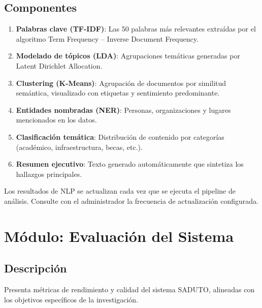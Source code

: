 \documentclass[12pt,a4paper]{article}
\begin{document}
\subsection{Componentes}
\begin{enumerate}
  \item \textbf{Palabras clave (TF-IDF)}: Las 50 palabras más relevantes extraídas por el algoritmo Term Frequency -- Inverse Document Frequency.
  \item \textbf{Modelado de tópicos (LDA)}: Agrupaciones temáticas generadas por Latent Dirichlet Allocation.
  \item \textbf{Clustering (K-Means)}: Agrupación de documentos por similitud semántica, visualizado con etiquetas y sentimiento predominante.
  \item \textbf{Entidades nombradas (NER)}: Personas, organizaciones y lugares mencionados en los datos.
  \item \textbf{Clasificación temática}: Distribución de contenido por categorías (académico, infraestructura, becas, etc.).
  \item \textbf{Resumen ejecutivo}: Texto generado automáticamente que sintetiza los hallazgos principales.
\end{enumerate}

\begin{tipbox}
Los resultados de NLP se actualizan cada vez que se ejecuta el pipeline de análisis. Consulte con el administrador la frecuencia de actualización configurada.
\end{tipbox}

\section{Módulo: Evaluación del Sistema}

\subsection{Descripción}
Presenta métricas de rendimiento y calidad del sistema SADUTO, alineadas con los objetivos específicos de la investigación.
\end{document}
